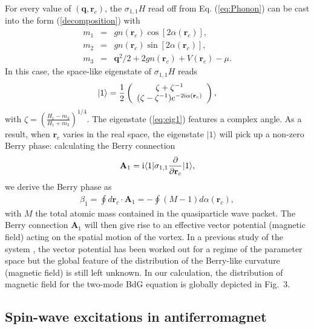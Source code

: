 \documentclass[pra,epsfig,rotate,superscriptaddress,showpacs]{revtex4}
\begin{document}
For every value of $(\mathbf{q},\mathbf{r}_c)$, the $\sigma_{1,1}H$ read off from Eq. (\ref{eq:Phonon}) can be cast into the form (\ref{decomposition}) with
\begin{eqnarray} \nonumber
m_1&=&gn(\mathbf{r}_c)\cos[2\alpha(\mathbf{r}_c)], \\ \nonumber
m_2&=&gn(\mathbf{r}_c)\sin[2\alpha(\mathbf{r}_c)], \\
m_3&=&\mathbf{q}^2/2+2gn(\mathbf{r}_c)+V(\mathbf{r}_c)-\mu.
\end{eqnarray}
In this case, the space-like eigenstate of $\sigma_{1,1}H$ reads
\begin{equation}\label{eq:eig1}
|1\rangle=\frac{1}{2}\left(\begin{array}{c}\zeta+\zeta^{-1} \\ (\zeta-\zeta^{-1})e^{-2{\text i}\alpha(\mathbf{r}_c)}\end{array} \right),
\end{equation}
with $\zeta=\left(\frac{H_1-m_3}{H_1+m_3}\right)^{1/4}$. The eigenstate (\ref{eq:eig1}) features a complex angle. As a result, when $\mathbf{r}_c$ varies in the real space, the eigenstate $|1\rangle$ will pick up a non-zero Berry phase: calculating the Berry connection
\begin{eqnarray} \nonumber
\mathbf{A}_1={\text i} \langle 1|\sigma_{1,1} \frac{\partial}{\partial \mathbf{r}_c}|1\rangle,
\end{eqnarray}
we derive the Berry phase as
\begin{eqnarray}
\beta_1=\oint d\mathbf{r}_c\cdot\mathbf{A}_1=-\oint(M-1)d\alpha(\mathbf{r}_c),
\end{eqnarray}
with $M$ the total atomic mass contained in the quasiparticle wave packet. The Berry connection $\mathbf{A}_1$ will then give rise to an effective vector potential (magnetic field) acting on the spatial motion of the vortex. In a previous study of the system \cite{ZhangNiu}, the vector potential has been worked out for a regime of the parameter space but the global feature of the distribution of the Berry-like curvature (magnetic field) is still left unknown. In our calculation, the distribution of magnetic field for the two-mode BdG equation is globally depicted in Fig.~3.

\subsection{Spin-wave excitations in antiferromagnet}
\end{document}
